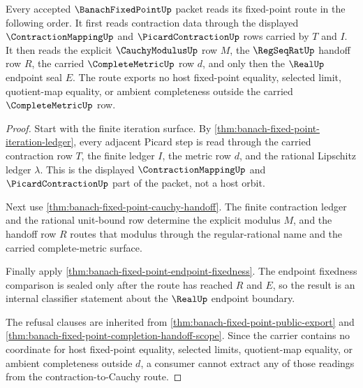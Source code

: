 \begin{theorem}
\label{thm:banach-fixed-point-contraction-cauchy-route}
Every accepted $\BanachFixedPointUp$ packet reads its fixed-point route in the following order. It first reads contraction data through the displayed $\ContractionMappingUp$ and $\PicardContractionUp$ rows carried by $T$ and $I$. It then reads the explicit $\CauchyModulusUp$ row $M$, the $\RegSeqRatUp$ handoff row $R$, the carried $\CompleteMetricUp$ row $d$, and only then the $\RealUp$ endpoint seal $E$. The route exports no host fixed-point equality, selected limit, quotient-map equality, or ambient completeness outside the carried $\CompleteMetricUp$ row.
\end{theorem}
\begin{proof}
Start with the finite iteration surface. By \autoref{thm:banach-fixed-point-iteration-ledger}, every adjacent Picard step is read through the carried contraction row $T$, the finite ledger $I$, the metric row $d$, and the rational Lipschitz ledger $\lambda$. This is the displayed $\ContractionMappingUp$ and $\PicardContractionUp$ part of the packet, not a host orbit.

Next use \autoref{thm:banach-fixed-point-cauchy-handoff}. The finite contraction ledger and the rational unit-bound row determine the explicit modulus $M$, and the handoff row $R$ routes that modulus through the regular-rational name and the carried complete-metric surface.

Finally apply \autoref{thm:banach-fixed-point-endpoint-fixedness}. The endpoint fixedness comparison is sealed only after the route has reached $R$ and $E$, so the result is an internal classifier statement about the $\RealUp$ endpoint boundary.

The refusal clauses are inherited from \autoref{thm:banach-fixed-point-public-export} and \autoref{thm:banach-fixed-point-completion-handoff-scope}. Since the carrier contains no coordinate for host fixed-point equality, selected limits, quotient-map equality, or ambient completeness outside $d$, a consumer cannot extract any of those readings from the contraction-to-Cauchy route.
\end{proof}

